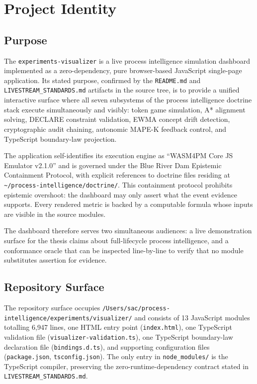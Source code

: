 
\section{Project Identity}
\label{sec:experiments-visualizer-identity}

\subsection{Purpose}
\label{sec:experiments-visualizer-identity-purpose}

The \texttt{experiments-visualizer} is a live process intelligence simulation dashboard implemented
as a zero-dependency, pure browser-based JavaScript single-page application. Its stated purpose,
confirmed by the \texttt{README.md} and \texttt{LIVESTREAM\_STANDARDS.md} artifacts in the source
tree, is to provide a unified interactive surface where all seven subsystems of the process
intelligence doctrine stack execute simultaneously and visibly: token game simulation, A*
alignment solving, DECLARE constraint validation, EWMA concept drift detection, cryptographic
audit chaining, autonomic MAPE-K feedback control, and TypeScript boundary-law projection.

The application self-identifies its execution engine as ``WASM4PM Core JS Emulator v2.1.0'' and
is governed under the Blue River Dam Epistemic Containment Protocol, with explicit references to
doctrine files residing at \texttt{\textasciitilde/process-intelligence/doctrine/}. This
containment protocol prohibits epistemic overshoot: the dashboard may only assert what the event
evidence supports. Every rendered metric is backed by a computable formula whose inputs are
visible in the source modules.

The dashboard therefore serves two simultaneous audiences: a live demonstration surface for the
thesis claims about full-lifecycle process intelligence, and a conformance oracle that can be
inspected line-by-line to verify that no module substitutes assertion for evidence.

\subsection{Repository Surface}
\label{sec:experiments-visualizer-identity-surface}

The repository surface occupies \texttt{/Users/sac/process-intelligence/experiments/visualizer/}
and consists of 13 JavaScript modules totalling 6,947 lines, one HTML entry point
(\texttt{index.html}), one TypeScript validation file (\texttt{visualizer-validation.ts}), one
TypeScript boundary-law declaration file (\texttt{bindings.d.ts}), and supporting configuration
files (\texttt{package.json}, \texttt{tsconfig.json}). The only entry in \texttt{node\_modules/}
is the TypeScript compiler, preserving the zero-runtime-dependency contract stated in
\texttt{LIVESTREAM\_STANDARDS.md}.


